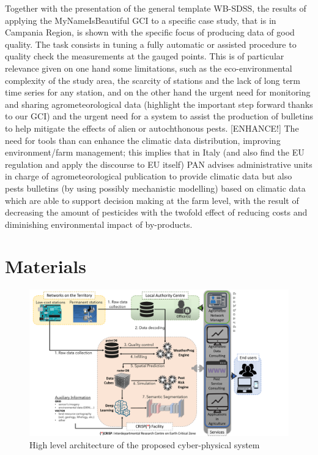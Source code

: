 \documentclass[authoryear,preprint,review,12pt]{elsarticle}
\begin{document}
Together with the presentation of the general template WB-SDSS, the results of applying the MyNameIsBeautiful GCI to a specific case study, that is in Campania Region, is shown with the specific focus of producing data of good quality.
The task consists in tuning a fully automatic or assisted procedure to quality check the measurements at the gauged points.
This is of particular relevance given on one hand some limitations, such as the eco-environmental complexity of the study area, the scarcity of stations and the lack of long term time series for any station, and on the other hand the urgent need for monitoring and sharing agrometeorological data (highlight the important step forward thanks to our GCI) and the urgent need for a system to assist the production of bulletins to help mitigate the effects of alien or autochthonous pests.
[ENHANCE!] The need for tools than can enhance the climatic data distribution, improving environment/farm management; this implies that in Italy (and also find the EU regulation and apply the discourse to EU itself) PAN advises administrative units in charge of agrometeorological publication to provide climatic data but also pests bulletins (by using possibly mechanistic modelling) based on climatic data which are able to support decision making at the farm level, with the result of decreasing the amount of pesticides with the twofold effect of reducing costs and diminishing environmental impact of by-products.

\section{Materials}

\begin{figure}
	\centering
	\includegraphics[scale=.5]{figures/fullSystem_GCI.pdf}
	\caption{High level architecture of the proposed cyber-physical system}
	\label{cyberPhysicalSystemFig}
\end{figure}
\end{document}
